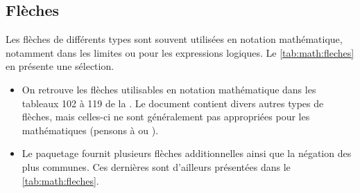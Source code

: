 \subsection{Flèches}
\label{sec:math:symboles:fleches}

Les flèches de différents types sont souvent utilisées en notation
mathématique, notamment dans les limites ou pour les expressions
logiques. Le \autoref{tab:math:fleches} en présente une sélection.

\begin{itemize}
\item On retrouve les flèches utilisables en notation mathématique
  dans les tableaux 102 à 119 de la %
  . %
  Le document contient divers autres types de flèches, mais celles-ci
  ne sont généralement pas appropriées pour les mathématiques (pensons
  à {\manerrarrow} ou {\faArrowRight}).
\item Le paquetage  fournit plusieurs flèches
  additionnelles ainsi que la négation des plus communes. Ces
  dernières sont d'ailleurs présentées dans le
  \autoref{tab:math:fleches}.
\end{itemize}


